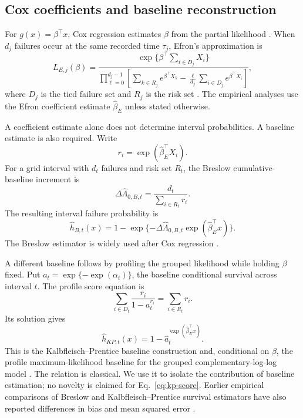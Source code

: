 \documentclass[smallextended,natbib]{svjour3}
\begin{document}
\subsection{Cox coefficients and baseline reconstruction}
\label{sec:cox-baselines}

For $g(x)=\beta^\top x$, Cox regression estimates $\beta$ from the partial likelihood \citep{cox1972}. When $d_j$ failures occur at the same recorded time $\tau_j$, Efron's approximation is
\begin{equation}
L_{E,j}(\beta)=
\frac{\exp\{\beta^\top\sum_{i\in D_j}X_i\}}
{\displaystyle\prod_{\ell=0}^{d_j-1}
\left[\sum_{k\in R_j}e^{\beta^\top X_k}
-\frac{\ell}{d_j}\sum_{i\in D_j}e^{\beta^\top X_i}\right]},
\label{eq:efron}
\end{equation}
where $D_j$ is the tied failure set and $R_j$ is the risk set \citep{efron1977}. The empirical analyses use the Efron coefficient estimate $\widehat\beta_E$ unless stated otherwise.

A coefficient estimate alone does not determine interval probabilities. A baseline estimate is also required. Write
\begin{equation}
r_i=\exp(\widehat\beta_E^\top X_i).
\end{equation}
For a grid interval with $d_t$ failures and risk set $R_t$, the Breslow cumulative-baseline increment is
\begin{equation}
\Delta\widehat\Lambda_{0,B,t}
 =\frac{d_t}{\sum_{i\in R_t}r_i}.
\label{eq:breslow-baseline}
\end{equation}
The resulting interval failure probability is
\begin{equation}
\widehat h_{B,t}(x)=
1-\exp\{-\Delta\widehat\Lambda_{0,B,t}\exp(\widehat\beta_E^\top x)\}.
\label{eq:breslow-prediction}
\end{equation}
The Breslow estimator is widely used after Cox regression \citep{breslow1974,xia2018}.

A different baseline follows by profiling the grouped likelihood while holding $\beta$ fixed. Put $a_t=\exp\{-\exp(\alpha_t)\}$, the baseline conditional survival across interval $t$. The profile score equation is
\begin{equation}
\sum_{i\in D_t}\frac{r_i}{1-a_t^{r_i}}
=
\sum_{i\in R_t}r_i.
\label{eq:kp-score}
\end{equation}
Its solution gives
\begin{equation}
\widehat h_{KP,t}(x)=1-\widehat a_t^{\exp(\widehat\beta_E^\top x)}.
\label{eq:kp-prediction}
\end{equation}
This is the Kalbfleisch--Prentice baseline construction and, conditional on $\beta$, the profile maximum-likelihood baseline for the grouped complementary-log-log model \citep{kalbfleisch1973,allison1982}. The relation is classical. We use it to isolate the contribution of baseline estimation; no novelty is claimed for Eq.~\eqref{eq:kp-score}. Earlier empirical comparisons of Breslow and Kalbfleisch--Prentice survival estimators have also reported differences in bias and mean squared error \citep{xia2018}.
\end{document}
